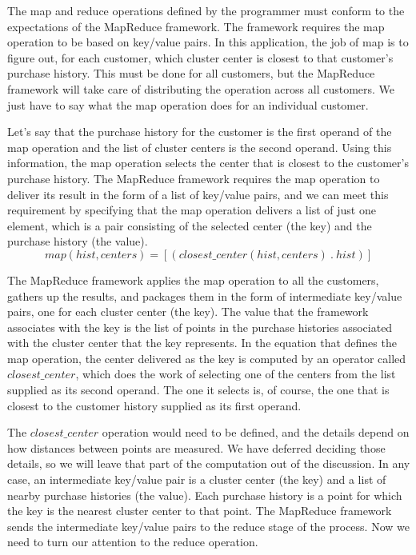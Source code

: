 The map and reduce operations defined by the programmer
must conform to the expectations of the MapReduce framework.
The framework requires the map operation to be based on
key/value pairs.  In this application, the job of map is
to figure out, for each customer, which cluster center
is closest to that customer's purchase history.
This must be done for all customers, but the MapReduce
framework will take care of distributing the operation across all customers.
We just have to say what the map operation does for an individual customer.

Let's say that the purchase history for the customer is the first operand
of the map operation and the list of cluster centers is the second operand.
Using this information, the map operation selects the center that is closest
to the customer's purchase history. The MapReduce framework requires the map
operation to deliver its result in the form of a list of key/value pairs,
and we can meet this requirement by specifying that the map operation
delivers a list of just one element, which is a pair consisting of
the selected center (the key) and the purchase history (the value).
\begin{displaymath}
map(hist, centers) = [ ( closest\_center(hist, centers) ~.~ hist ) ]
\end{displaymath}

The MapReduce framework applies the map operation to all the customers,
gathers up the results, and packages them in the form of
intermediate key/value pairs, one for each cluster center (the key).
The value that the framework associates with the key is the list of
points in the purchase histories associated with the cluster center that
the key represents.
In the equation that defines the map operation,
the center delivered as the key is computed by an operator
called $closest\_center$, which does the work of selecting one
of the centers from the list supplied as its second operand.
The one it selects is, of course, the one that is closest to
the customer history supplied as its first operand.

The $closest\_center$ operation would need to be defined,
and the details depend on how distances between
points are measured. We have deferred deciding those
details, so we will leave that part of the computation
out of the discussion.
In any case, an intermediate key/value pair is a cluster center
(the key) and a list of nearby purchase histories
(the value). Each purchase history is a point for which the
key is the nearest cluster center to that point.
The MapReduce framework sends the intermediate key/value pairs
to the reduce stage of the process.
Now we need to turn our attention to the reduce operation.

